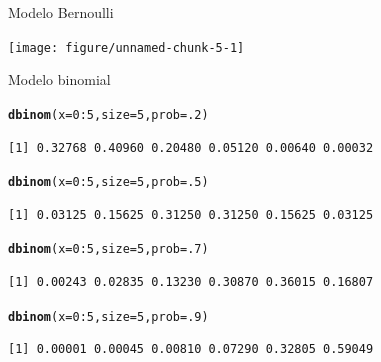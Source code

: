 \documentclass[10pt]{beamer}\usepackage[]{graphicx}\usepackage[]{color}
\makeatletter
\newcommand{\hlnum}[1]{\textcolor[rgb]{0.686,0.059,0.569}{#1}}%
\newcommand{\hlopt}[1]{\textcolor[rgb]{0,0,0}{#1}}%
\newcommand{\hlstd}[1]{\textcolor[rgb]{0.345,0.345,0.345}{#1}}%
\newcommand{\hlkwc}[1]{\textcolor[rgb]{0.333,0.667,0.333}{#1}}%
\newcommand{\hlkwd}[1]{\textcolor[rgb]{0.737,0.353,0.396}{\textbf{#1}}}%
\newenvironment{kframe}{%
 \def\at@end@of@kframe{}%
 \ifinner\ifhmode%
  \def\at@end@of@kframe{\end{minipage}}%
  \begin{minipage}{\columnwidth}%
 \fi\fi%
 \def\FrameCommand##1{\hskip\@totalleftmargin \hskip-\fboxsep
 \colorbox{shadecolor}{##1}\hskip-\fboxsep
     \hskip-\linewidth \hskip-\@totalleftmargin \hskip\columnwidth}%
 \MakeFramed {\advance\hsize-\width
   \@totalleftmargin\z@ \linewidth\hsize
   \@setminipage}}%
 {\par\unskip\endMakeFramed%
 \at@end@of@kframe}
\newenvironment{knitrout}{}{} %
\theoremstyle{definition}
\makeatother
\begin{document}
\begin{frame}[fragile]{Modelo Bernoulli}
\begin{knitrout}\small
{}\color{fgcolor}

{\centering \texttt{[image: figure/unnamed-chunk-5-1]} 

}



\end{knitrout}
\end{frame}

\begin{frame}[fragile]{Modelo binomial}
\begin{knitrout}\small
{}\color{fgcolor}\begin{kframe}
\begin{alltt}
\hlkwd{dbinom}\hlstd{(}\hlkwc{x} \hlstd{=} \hlnum{0}\hlopt{:}\hlnum{5}\hlstd{,} \hlkwc{size} \hlstd{=} \hlnum{5}\hlstd{,} \hlkwc{prob} \hlstd{=} \hlnum{.2}\hlstd{)}
\end{alltt}
\begin{verbatim}
[1] 0.32768 0.40960 0.20480 0.05120 0.00640 0.00032
\end{verbatim}
\begin{alltt}
\hlkwd{dbinom}\hlstd{(}\hlkwc{x} \hlstd{=} \hlnum{0}\hlopt{:}\hlnum{5}\hlstd{,} \hlkwc{size} \hlstd{=} \hlnum{5}\hlstd{,} \hlkwc{prob} \hlstd{=} \hlnum{.5}\hlstd{)}
\end{alltt}
\begin{verbatim}
[1] 0.03125 0.15625 0.31250 0.31250 0.15625 0.03125
\end{verbatim}
\begin{alltt}
\hlkwd{dbinom}\hlstd{(}\hlkwc{x} \hlstd{=} \hlnum{0}\hlopt{:}\hlnum{5}\hlstd{,} \hlkwc{size} \hlstd{=} \hlnum{5}\hlstd{,} \hlkwc{prob} \hlstd{=} \hlnum{.7}\hlstd{)}
\end{alltt}
\begin{verbatim}
[1] 0.00243 0.02835 0.13230 0.30870 0.36015 0.16807
\end{verbatim}
\begin{alltt}
\hlkwd{dbinom}\hlstd{(}\hlkwc{x} \hlstd{=} \hlnum{0}\hlopt{:}\hlnum{5}\hlstd{,} \hlkwc{size} \hlstd{=} \hlnum{5}\hlstd{,} \hlkwc{prob} \hlstd{=} \hlnum{.9}\hlstd{)}
\end{alltt}
\begin{verbatim}
[1] 0.00001 0.00045 0.00810 0.07290 0.32805 0.59049
\end{verbatim}
\end{kframe}
\end{knitrout}
\end{frame}
\end{document}
